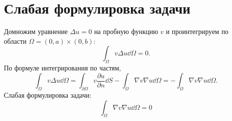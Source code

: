 \documentclass{report}
\begin{document}
\section{Слабая формулировка задачи}
Домножим уравнение $\Delta u = 0$ на пробную функцию $v$ и проинтегрируем по области $\Omega = (0,a)\times(0,b)$:
\begin{equation}
	\int_{\Omega}v \Delta u \dd{\Omega}=0.
\end{equation}
По формуле интегрирования по частям,
\begin{equation}
	\int_{\Omega}v \Delta u \dd{\Omega}=\int_{\partial \Omega}v\frac{\partial u}{\partial n}\dd{S}-\int_{\Omega}\nabla v\nabla u \dd{\Omega}=-\int_{\Omega}\nabla v \nabla u \dd{\Omega}.
\end{equation}
Слабая формулировка задачи:
\begin{equation}\label{weak_form}
	\int_{\Omega} \nabla v \nabla u \dd{\Omega}=0
\end{equation}
\end{document}
